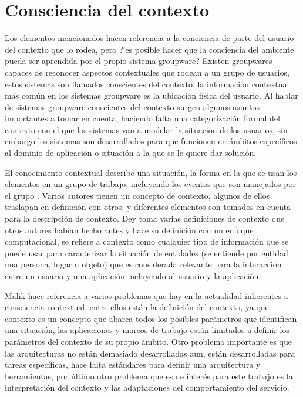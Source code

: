 \section{Consciencia del contexto}

Los elementos mencionados hacen referencia a la conciencia de parte del usuario del contexto que lo rodea, pero ?`es posible hacer que la conciencia del ambiente pueda ser aprendida por el propio sistema groupware? Existen groupwares capaces de reconocer aspectos contextuales que rodean a un grupo de usuarios, estos sistemas son llamados conscientes del contexto, la informaci\'on contextual m\'as com\'un en los sistemas groupware es la ubicaci\'on f\'isica del usuario. Al hablar de sistemas groupware conscientes del contexto surgen algunos asuntos importantes a tomar en cuenta, haciendo falta una categorizaci\'on formal del contexto con el que los sistemas van a modelar la situaci\'on de los usuarios, sin embargo los sistemas son desarrollados para que funcionen en \'ambitos espec\'ificos al dominio de aplicaci\'on o situaci\'on a la que se le quiere dar soluci\'on.

El conocimiento contextual describe una situaci\'on, la forma en la que se usan los elementos en un grupo de trabajo, incluyendo los eventos que son manejados por el grupo \citep{brezillon2004context}. Varios autores tienen un concepto de contexto, algunos de ellos traslapan en definici\'on con otros, y diferentes elementos son tomados en cuenta para la descripci\'on de contexto. Dey \citep{dey2001conceptual} toma varias definiciones de contexto que otros autores hab\'ian hecho antes y hace su definici\'on con un enfoque computacional, se refiere a contexto como cualquier tipo de informaci\'on que se puede usar para caracterizar la situaci\'on de entidades (se entiende por entidad una persona, lugar u objeto) que es considerada relevante para la interacci\'on entre un usuario y una aplicaci\'on incluyendo al usuario y la aplicaci\'on.

Malik \citep{malik2007future} hace referencia a varios problemas que hay en la actualidad inherentes a consciencia contextual, entre ellos est\'an la definici\'on del contexto, ya que contexto es un concepto que abarca todos los posibles par\'ametros que identifican una situaci\'on, las aplicaciones y marcos de trabajo est\'an limitados a definir los par\'ametros del contexto de su propio \'ambito. Otro problema importante es que las arquitecturas no est\'an demasiado desarrolladas aun, est\'an desarrolladas para tareas espec\'ificas, hace falta est\'andares para definir una arquitectura y herramientas, por \'ultimo otro problema que es de inter\'es para este trabajo es la interpretaci\'on del contexto y las adaptaciones del comportamiento del servicio. 

